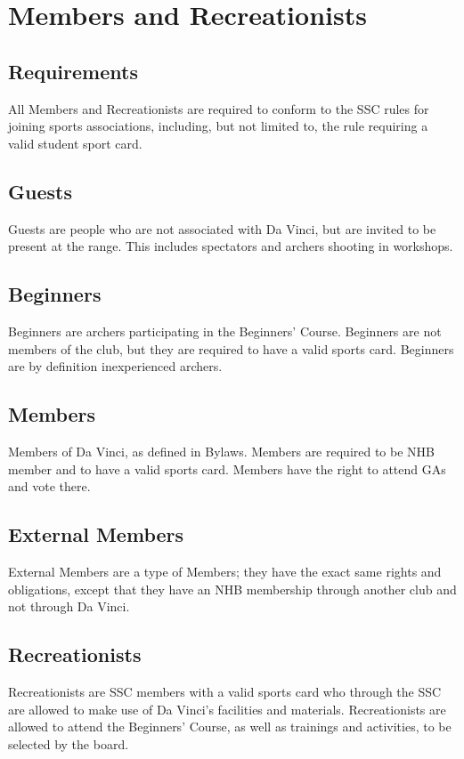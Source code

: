 \documentclass[a4paper]{article}
\newcommand{\Asta}{Bylaws} %
\begin{document}
\pagebreak

\section{Members and Recreationists}
\subsection{Requirements}
All Members and Recreationists are required to conform to the SSC rules for joining sports associations, including, but not limited to, the rule requiring a valid student sport card.

\subsection{Guests}
Guests are people who are not associated with Da Vinci, but are invited to be present at the range. This includes spectators and archers shooting in workshops.

\subsection{Beginners}
Beginners are archers participating in the Beginners' Course. Beginners are not members of the club, but they are required to have a valid sports card. Beginners are by definition inexperienced archers.

\subsection{Members}
Members of Da Vinci, as defined in \Asta. Members are required to be NHB member and to have a valid sports card. Members have the right to attend GAs and vote there.

\subsection{External Members}
External Members are a type of Members; they have the exact same rights and obligations, except that they have an NHB membership through another club and not through Da Vinci.

\subsection{Recreationists}
Recreationists are SSC members with a valid sports card who through the SSC are allowed to make use of Da Vinci's facilities and materials. Recreationists are allowed to attend the Beginners' Course, as well as trainings and activities, to be selected by the board. \\
\end{document}
